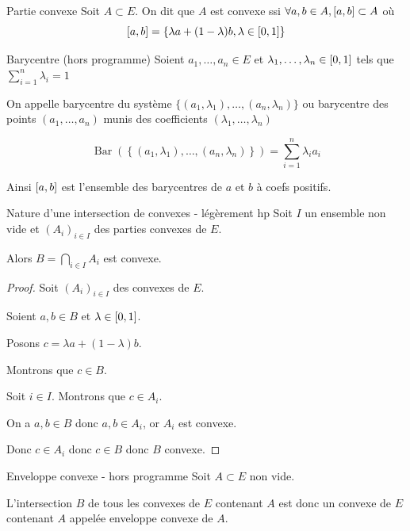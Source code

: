 \begin{definition}{Partie convexe}{}
    Soit $A \subset E$. 
    On dit que $A$ est convexe ssi $\forall a, b \in A, \left[a, b\right] \subset A$ où 
    $$\left[a, b\right] = \{\lambda a + (1 - \lambda)b, \lambda \in [0, 1]\}$$
\end{definition}

\begin{definition}{Barycentre (hors programme)}{}
    Soient $a_1, \dots, a_n \in E$ et $\lambda_1, \dots, \lambda_n \in \left[0, 1\right]$
    tels que $\sum_{i = 1}^n \lambda_i = 1$

    On appelle barycentre du système $\{(a_1, \lambda_1), \dots, (a_n, \lambda_n)\}$
    ou barycentre des points $(a_1, \dots, a_n)$ munis des coefficients $(\lambda_1, \dots, \lambda_n)$

    $$\operatorname{Bar}(\left\{(a_1, \lambda_1), \dots, (a_n, \lambda_n)\right\}) = \sum_{i = 1}^n \lambda_i a_i$$

    Ainsi $\left[a, b\right]$ est l'ensemble des barycentres de $a$ et $b$ à coefs positifs. 
\end{definition}

\begin{proposition}{Nature d'une intersection de convexes - légèrement hp}{}
    Soit $I$ un ensemble non vide et $(A_i)_{i \in I}$ des parties convexes de $E$. 

    Alors $\displaystyle B = \bigcap_{i \in I} A_i$ est convexe.
\end{proposition}


\begin{proof}
    Soit $(A_i)_{i \in I}$ des convexes de $E$. 

    Soient $a, b \in B$ et $\lambda \in \left[0, 1\right]$. 

    Posons $c = \lambda a + (1 - \lambda)b$. 

    Montrons que $c \in B$. 

    Soit $i \in I$. Montrons que $c \in A_i$. 

    On a $a, b \in B$ donc $a, b \in A_i$, or $A_i$ est convexe. 

    Donc $c \in A_i$ donc $c \in B$ donc $B$ convexe. 
\end{proof}

\begin{definition}{Enveloppe convexe - hors programme}{}
    Soit $A \subset E$ non vide. 

    L'intersection $B$ de tous les convexes de $E$ contenant $A$ est donc un convexe
    de $E$ contenant $A$ appelée enveloppe convexe de $A$.
\end{definition}


